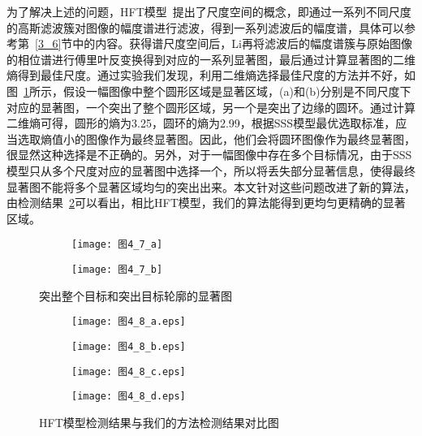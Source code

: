 为了解决上述的问题，HFT模型~\cite{LiJianTPAMI2013Scale}提出了尺度空间的概念，即通过一系列不同尺度的高斯滤波簇对图像的幅度谱进行滤波，得到一系列滤波后的幅度谱，具体可以参考第~\ref{3_6}节中的内容。获得谱尺度空间后，Li再将滤波后的幅度谱簇与原始图像的相位谱进行傅里叶反变换得到对应的一系列显著图，最后通过计算显著图的二维熵得到最佳尺度。通过实验我们发现，利用二维熵选择最佳尺度的方法并不好，如图~\ref{图4_7}所示，假设一幅图像中整个圆形区域是显著区域，(a)和(b)分别是不同尺度下对应的显著图，一个突出了整个圆形区域，另一个是突出了边缘的圆环。通过计算二维熵可得，圆形的熵为3.25，圆环的熵为2.99，根据SSS模型最优选取标准，应当选取熵值小的图像作为最终显著图。因此，他们会将圆环图像作为最终显著图，很显然这种选择是不正确的。另外，对于一幅图像中存在多个目标情况，由于SSS模型只从多个尺度对应的显著图中选择一个，所以将丢失部分显著信息，使得最终显著图不能将多个显著区域均匀的突出出来。本文针对这些问题改进了新的算法，由检测结果~\ref{图4_8}可以看出，相比HFT模型，我们的算法能得到更均匀更精确的显著区域。
\begin{figure}[t]
  \centering%
  \begin{subfigure}{0.39\textwidth}
    \texttt{[image: 图4\_7\_a]}
    \caption{}
  \end{subfigure}
  \hspace{4em}%
  \begin{subfigure}{0.4\textwidth}
    \texttt{[image: 图4\_7\_b]}
    \caption{}
  \end{subfigure}
  \caption{突出整个目标和突出目标轮廓的显著图}
  \label{图4_7}
\end{figure}
\begin{figure}[b]
  \centering%
  \begin{subfigure}{4cm}
    \texttt{[image: 图4\_8\_a.eps]}
    \caption{}
  \end{subfigure}
  \hspace{4em}%
  \begin{subfigure}{0.25\textwidth}
    \texttt{[image: 图4\_8\_b.eps]}
    \caption{}
  \end{subfigure}
  \hspace{4em}%
  \begin{subfigure}{0.25\textwidth}
    \texttt{[image: 图4\_8\_c.eps]}
    \caption{}
  \end{subfigure}
  \hspace{4em}%
  \begin{subfigure}{0.25\textwidth}
    \texttt{[image: 图4\_8\_d.eps]}
    \caption{}
  \end{subfigure}
  \caption{HFT模型检测结果与我们的方法检测结果对比图}
  \label{图4_8}
\end{figure}

